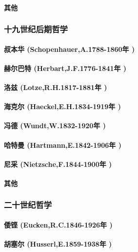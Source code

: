 \documentclass[UTF8]{../RepresentationUniverse}
\begin{document}
    \paragraph{其他}

\subsubsection{十九世纪后期哲学}
    \paragraph{叔本华 (Schopenhauer,A.1788-1860年 )}
    \paragraph{赫尔巴特 (Herbart,J.F.1776-1841年 )}
    \paragraph{洛兹 (Lotze,R.H.1817-1881年 )}
    \paragraph{海克尔 (Haeckel,E.H.1834-1919年 )}
    \paragraph{冯德 (Wundt,W.1832-1920年 )}
    \paragraph{哈特曼 (Hartmann,E.1842-1906年 )}
    \paragraph{尼采 (Nietzsche,F.1844-1900年 )}
    \paragraph{其他}

\subsubsection{二十世纪哲学}
    \paragraph{倭铿 (Eucken,R.C.1846-1926年 )}
    \paragraph{胡塞尔 (Husserl,E.1859-1938年 )}
\end{document}
